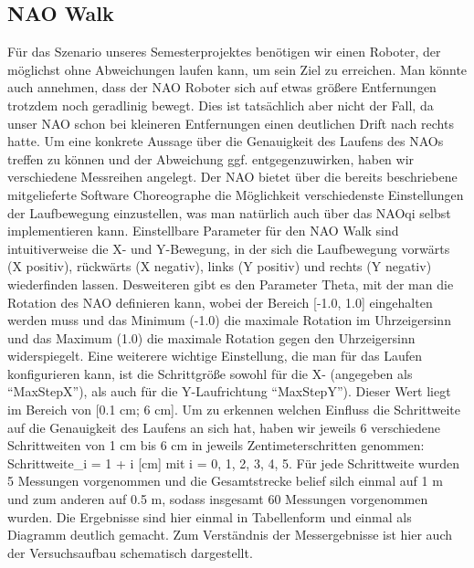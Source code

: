 \subsection{NAO Walk}
Für das Szenario unseres Semesterprojektes benötigen wir einen Roboter, der möglichst ohne Abweichungen laufen kann, um sein Ziel zu erreichen.
Man könnte auch annehmen, dass der NAO Roboter sich auf etwas größere Entfernungen trotzdem noch geradlinig bewegt. Dies ist tatsächlich aber nicht der Fall, da unser NAO schon bei kleineren Entfernungen einen deutlichen Drift nach rechts hatte. Um eine konkrete Aussage über die Genauigkeit des Laufens des NAOs treffen zu können und der Abweichung ggf. entgegenzuwirken, haben wir verschiedene Messreihen angelegt. Der NAO bietet über die bereits beschriebene mitgelieferte Software Choreographe die Möglichkeit verschiedenste Einstellungen der Laufbewegung einzustellen, was man natürlich auch über das NAOqi selbst implementieren kann. Einstellbare Parameter für den NAO Walk sind intuitiverweise die X- und Y-Bewegung, in der sich die Laufbewegung vorwärts (X positiv), rückwärts (X negativ), links (Y positiv) und rechts (Y negativ) wiederfinden lassen. Desweiteren gibt es den Parameter Theta, mit der man die Rotation des NAO definieren kann, wobei der Bereich [-1.0, 1.0] eingehalten werden muss und das Minimum (-1.0) die maximale Rotation im Uhrzeigersinn und das Maximum (1.0) die maximale Rotation gegen den Uhrzeigersinn widerspiegelt. Eine weiterere wichtige Einstellung, die man für das Laufen konfigurieren kann, ist die Schrittgröße sowohl für die X- (angegeben als ``MaxStepX''), als auch für die Y-Laufrichtung ``MaxStepY''). Dieser Wert liegt im Bereich von [0.1 cm; 6 cm].
Um zu erkennen welchen Einfluss die Schrittweite auf die Genauigkeit des Laufens an sich hat, haben wir jeweils 6 verschiedene Schrittweiten von 1 cm bis 6 cm in jeweils Zentimeterschritten genommen: Schrittweite\_i = 1 + i [cm] mit i = {0, 1, 2, 3, 4, 5}. Für jede Schrittweite wurden 5 Messungen vorgenommen und die Gesamtstrecke belief silch einmal auf 1 m und zum anderen auf 0.5 m, sodass insgesamt 60 Messungen vorgenommen wurden. Die Ergebnisse sind hier einmal in Tabellenform und einmal als Diagramm deutlich gemacht.
Zum Verständnis der Messergebnisse ist hier auch der Versuchsaufbau schematisch dargestellt.

